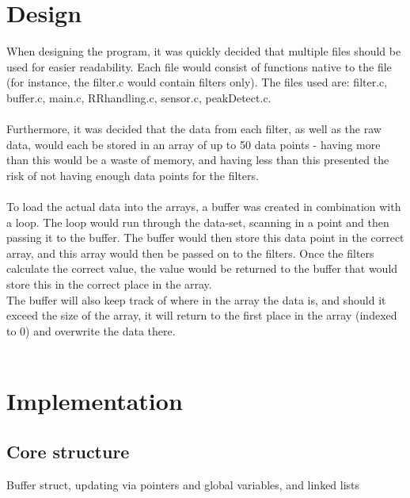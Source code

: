 \documentclass[12pt,a4paper]{article}
\begin{document}
\section{Design}
	When designing the program, it was quickly decided that multiple files should be used for easier readability. Each file would consist of functions native to the file (for instance, the filter.c would contain filters only). The files used are: filter.c, buffer.c, main.c, RRhandling.c, sensor.c, peakDetect.c.\\
	\\
	Furthermore, it was decided that the data from each filter, as well as the raw data, would each be stored in an array of up to 50 data points - having more than this would be a waste of memory, and having less than this presented the risk of not having enough data points for the filters.\\
	\\
	To load the actual data into the arrays, a buffer was created in combination with a loop. The loop would run through the data-set, scanning in a point and then passing it to the buffer. The buffer would then store this data point in the correct array, and this array would then be passed on to the filters. Once the filters calculate the correct value, the value would be returned to the buffer that would store this in the correct place in the array.\\
	The buffer will also keep track of where in the array the data is, and should it exceed the size of the array, it will return to the first place in the array (indexed to 0) and overwrite the data there.\\
	\\


\section{Implementation}
\subsection{Core structure}
Buffer struct, updating via pointers and global variables, and linked lists
\end{document}
